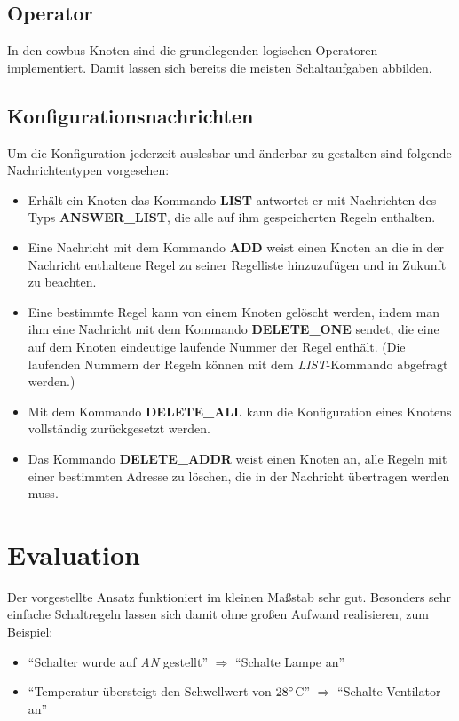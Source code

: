 \documentclass{IEEEtran}
\begin{document}
    \subsection{Operator}
		In den cowbus-Knoten sind die grundlegenden logischen Operatoren implementiert.
		Damit lassen sich bereits die meisten Schaltaufgaben abbilden.
    \subsection{Konfigurationsnachrichten}
        Um die Konfiguration jederzeit auslesbar und änderbar zu gestalten
        sind folgende Nachrichtentypen vorgesehen:

        \begin{itemize}
            \item Erhält ein Knoten das Kommando \textbf{LIST} antwortet
                er mit Nachrichten des Typs \textbf{ANSWER\_LIST},
                die alle auf ihm gespeicherten Regeln enthalten.
            \item Eine Nachricht mit dem Kommando \textbf{ADD} weist einen
                Knoten an die in der Nachricht enthaltene Regel zu seiner
                Regelliste hinzuzufügen und in Zukunft zu beachten.
            \item Eine bestimmte Regel kann von einem Knoten gelöscht werden,
                indem man ihm eine Nachricht mit dem Kommando
                \textbf{DELETE\_ONE} sendet, die eine auf dem Knoten eindeutige
                laufende Nummer der Regel enthält.
                (Die laufenden Nummern der Regeln können mit dem
                \emph{LIST}-Kommando abgefragt werden.)
            \item Mit dem Kommando \textbf{DELETE\_ALL} kann die Konfiguration
                eines Knotens vollständig zurückgesetzt werden.
            \item Das Kommando \textbf{DELETE\_ADDR} weist einen Knoten an,
                alle Regeln mit einer bestimmten Adresse zu löschen,
                die in der Nachricht übertragen werden muss.
        \end{itemize}


\section{Evaluation}
    Der vorgestellte Ansatz funktioniert im kleinen Maßstab sehr gut.
    Besonders sehr einfache Schaltregeln lassen sich damit ohne großen Aufwand
    realisieren, zum Beispiel:
    \begin{itemize}
        \item \enquote{Schalter wurde auf \emph{AN} gestellt} $\Rightarrow$
            \enquote{Schalte Lampe an}
        \item \enquote{Temperatur übersteigt den Schwellwert von $28\degree$C} $\Rightarrow$
            \enquote{Schalte Ventilator an}
    \end{itemize}
\end{document}
